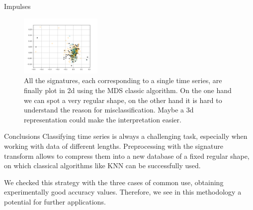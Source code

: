 \documentclass[twocolumn,9pt]{article}
\theoremstyle{definition}
\theoremstyle{remark}
\begin{document}
\begin{section}{Impulses}
\begin{figure}[H]
\center
\includegraphics[width=0.35\textwidth]{proposed_plots/IMP-isometry-seed0.png}
\caption{
All the signatures, each corresponding to a single time series,
are finally plot in 2d using the MDS classic algorithm.
On the one hand we can spot a very regular shape,
on the other hand it is hard to understand the reason for
misclassification.
Maybe a 3d representation
could make the interpretation easier.
}
\end{figure}

\end{section}


\begin{section}{Conclusions}
Classifying time series is always a challenging task, especially when
working with data of different lengths.
Preprocessing with the signature transform allows to compress
them into a new database of a fixed regular shape,
on which classical algorithms like KNN can be successfully used.

We checked this strategy with the three cases of common use,
obtaining experimentally good accuracy values.
Therefore, we see in this methodology a potential for further applications.
\end{section}



\end{document}
